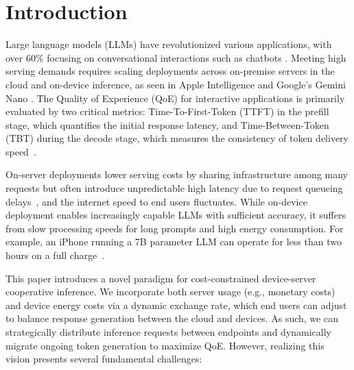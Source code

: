 \section{Introduction}

Large language models (LLMs) have revolutionized various applications, with over 60\% focusing on conversational interactions such as chatbots \citep{llm-market-report}. 
Meeting high serving demands requires scaling deployments across on-premise servers in the cloud and on-device inference, as seen in Apple Intelligence \citep{appleintelligence} and Google's Gemini Nano \citep{gemini_nano}.
The Quality of Experience (QoE) for interactive applications is primarily evaluated by two critical metrics: Time-To-First-Token (TTFT) in the prefill stage, which quantifies the initial response latency, and Time-Between-Token (TBT) during the decode stage, which measures the consistency of token delivery speed~\citep{databricks2023llm,andes,cachegen}.

On-server deployments lower serving costs by sharing infrastructure among many requests but often introduce unpredictable high latency due to request queueing delays~\citep{sarathi}, and the internet speed to end users fluctuates. While on-device deployment enables increasingly capable LLMs with sufficient accuracy, it suffers from slow processing speeds for long prompts and high energy consumption. For example, an iPhone running a 7B parameter LLM can operate for less than two hours on a full charge~\citep{liu2024mobilellm}.

This paper introduces a novel paradigm for cost-constrained device-server cooperative inference. We incorporate both server usage (e.g., monetary costs) and device energy costs via a dynamic exchange rate, which end users can adjust to balance response generation between the cloud and devices. 
As such, we can strategically distribute inference requests between endpoints and dynamically migrate ongoing token generation to maximize QoE. 
However, realizing this vision presents several fundamental challenges: 

